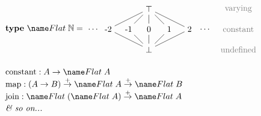\documentclass[dvipsnames,fleqn]{beamer}
\newcommand\N{\mathbb{N}}
\newcommand\kw\textbf
\newcommand\name\text
\newcommand\dto\to
\newcommand\mto{\overset{+}{\to}}
\newcommand\shaded{\color{gray}}
\begin{document}
\begin{frame}{}\large
  \[
  \begin{array}{l}
    \kw{type}~\tflat{\N} =
    \begin{tikzpicture}[scale=.85,baseline={([yshift=-.5ex]current bounding box.center)}]
      \node (top)  at ( 0, 1) {$\top$};
      \node (bot)  at ( 0,-1) {$\bot$};
      \node (-3)   at (-2.75, 0) {$\hdots$};
      \node (-2)   at (-2, 0) {-2};
      \node (-1)   at (-1, 0) {-1};
      \node (0)    at ( 0, 0) {0};
      \node (1)    at ( 1, 0) {1};
      \node (2)    at ( 2, 0) {2};
      \node (3)    at ( 2.75, 0) {$\hdots$};
      \node (varying)   at (4.4, 1) {\normalsize\shaded varying};
      \node (constant)  at (4.4, 0) {\normalsize\shaded constant};
      \node (undefined) at (4.4,-1) {\normalsize\shaded undefined};
      \draw (bot) -- (-2) -- (top) -- (-1) -- (bot) -- (0) -- (top)
      -- (1) -- (bot) -- (2) -- (top);
    \end{tikzpicture}
    \\[4em]
    \name{constant} : A \dto \tflat{A}\\
    \name{map} : (A \dto B) \mto \tflat{A} \mto \tflat{B}\\
    \name{join} : \tflat{(\tflat{A})} \mto \tflat{A}
    \\[.5ex]
    \textit{\& so on...}
  \end{array}\]

\end{frame}
\end{document}
